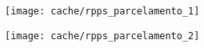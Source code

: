 


\begin{figure}[H]
\center
\texttt{[image: cache/rpps\_parcelamento\_1]}
\end{figure}

\begin{figure}[H]
\center
\texttt{[image: cache/rpps\_parcelamento\_2]}
\end{figure}

